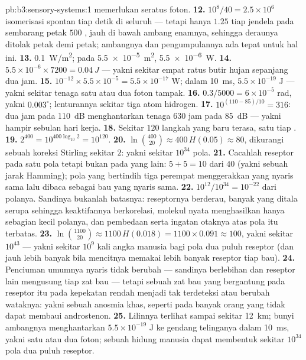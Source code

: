 \begin{solution}{pb:b3:sensory-systems:1}
memerlukan seratus foton.
\textbf{12.} $10^{8}/40 = 2.5\times 10^{6}$ isomerisasi spontan tiap
detik di seluruh  --- tetapi hanya $1.25$ tiap jendela pada sembarang petak
$500$ , jauh di bawah ambang enamnya, sehingga deraunya ditolak
petak demi petak; ambangnya dan pengumpulannya ada tepat untuk hal ini.
\textbf{13.} \qty{0.1}{W/m^2}; pada \qty{5.5e-5}{m^2}, \qty{5.5e-6}{W}.
\textbf{14.} $5.5\times 10^{-6}\times 7200 = \qty{0.04}{J}$ --- yakni sekitar empat
ratus butir hujan sepanjang dua jam.
\textbf{15.} $10^{-12}\times 5.5\times 10^{-5} = 5.5\times 10^{-17}$ W;
dalam \qty{10}{ms}, $5.5\times 10^{-19}$ J --- yakni sekitar tenaga satu atau
dua foton tampak.
\textbf{16.} $0.3/5000 = 6\times 10^{-5}$ rad, yakni $0.003^{\circ}$;
lenturannya sekitar tiga atom hidrogen.
\textbf{17.} $10^{(110 - 85)/10} = 316$: dua jam pada \qty{110}{dB}
menghantarkan tenaga $630$ jam pada \qty{85}{dB} --- yakni hampir sebulan
hari kerja.
\textbf{18.} Sekitar $120$ langkah yang baru terasa, satu tiap .
\textbf{19.} $2^{400} = 10^{400\log_{10}2} = 10^{120}$.
\textbf{20.} $\ln\binom{400}{20} \approx 400\,H(0.05) \approx 80$, dikurangi sebuah
koreksi Stirling sekitar $2$: yakni sekitar $10^{34}$ pola.
\textbf{21.} Cacahlah reseptor pada satu pola tetapi bukan pada yang lain: $5 +
5 = 10$ dari $40$ (yakni sebuah jarak Hamming); pola yang bertindih tiga
perempat menggerakkan  yang nyaris sama lalu dibaca sebagai bau yang nyaris
sama.
\textbf{22.} $10^{12}/10^{34} = 10^{-22}$ dari polanya. Sandinya bukanlah
batasnya: reseptornya berderau, banyak yang ditala serupa sehingga
keaktifannya berkorelasi, molekul nyata menghasilkan hanya sebagian kecil
polanya, dan pembedaan serta ingatan otaknya atas pola itu terbatas.
\textbf{23.} $\ln\binom{1100}{20} \approx 1100\,H(0.018) = 1100\times
0.091 \approx 100$, yakni sekitar $10^{43}$ --- yakni sekitar $10^{9}$ kali angka
manusia bagi pola dua puluh reseptor (dan jauh lebih banyak bila mencitnya memakai
lebih banyak reseptor tiap bau).
\textbf{24.} Penciuman umumnya nyaris tidak berubah --- sandinya berlebihan dan
reseptor lain mengusung tiap zat bau --- tetapi sebuah zat bau yang bergantung pada
reseptor itu pada kepekatan rendah menjadi tak terdeteksi atau berubah
wataknya: yakni sebuah anosmia khas, seperti pada banyak orang yang tidak dapat
membaui androstenon.
\textbf{25.} Lilinnya terlihat sampai sekitar \qty{12}{km}; bunyi ambangnya
menghantarkan $5.5\times 10^{-19}$ J ke gendang telinganya dalam \qty{10}{ms}, yakni satu atau
dua foton; sebuah hidung manusia dapat membentuk sekitar $10^{34}$ pola dua puluh reseptor.
\end{solution}
